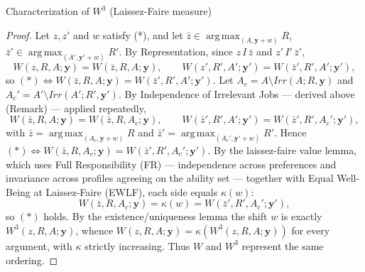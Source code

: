 \documentclass[10pt]{beamer}
\DeclareMathOperator*{\argmax}{arg\,max}
\begin{document}
\begin{frame}[allowframebreaks]{Characterization of $W^3$ (Laissez-Faire measure)}
\begin{proof}
Let $z,z'$ and $w$ satisfy (*), and let
$\bar z\in\argmax_{(A,\mathbf y+w)}R$, $\bar z'\in\argmax_{(A',\mathbf
y'+w)}R'$. By Representation, since $z\,I\,\bar z$ and $z'\,I'\,\bar z'$,
\begin{equation*}
W(z,R,A;\mathbf y)=W(\bar z,R,A;\mathbf y),\qquad
W(z',R',A';\mathbf y')=W(\bar z',R',A';\mathbf y'),
\end{equation*}
so $(*)\Leftrightarrow W(\bar z,R,A;\mathbf y)=W(\bar z',R',A';\mathbf y')$.
Let $A_c=A\setminus Irr(A;R,\mathbf y)$ and $A_c'=A'\setminus Irr(A';R',\mathbf
y')$.
By Independence of Irrelevant Jobs --- derived above (Remark) --- applied
repeatedly,
\begin{equation*}
W(\bar z,R,A;\mathbf y)=W(\bar z,R,A_c;\mathbf y),\qquad
W(\bar z',R',A';\mathbf y')=W(\bar z',R',A_c';\mathbf y'),
\end{equation*}
with $\bar z=\argmax_{(A_c,\mathbf y+w)}R$ and
$\bar z'=\argmax_{(A_c',\mathbf y'+w)}R'$. Hence
$(*)\Leftrightarrow W(\bar z,R,A_c;\mathbf y)=W(\bar z',R',A_c';\mathbf y')$.
By the laissez-faire value lemma, which uses Full Responsibility (FR) ---
independence across preferences and invariance across profiles agreeing on the
ability set --- together with Equal Well-Being at Laissez-Faire (EWLF), each
side equals $\kappa(w)$:
\begin{equation*}
W(\bar z,R,A_c;\mathbf y)=\kappa(w)=W(\bar z',R',A_c';\mathbf y'),
\end{equation*}
so $(*)$ holds. By the existence/uniqueness lemma the shift $w$ is exactly
$W^3(z,R,A;\mathbf y)$, whence $W(z,R,A;\mathbf y)=\kappa(W^3(z,R,A;\mathbf y))$
for every argument, with $\kappa$ strictly increasing. Thus $W$ and $W^3$
represent the same ordering.
\end{proof}

\medskip
\hyperlink{tab:classification}{}
\end{frame}
\end{document}

